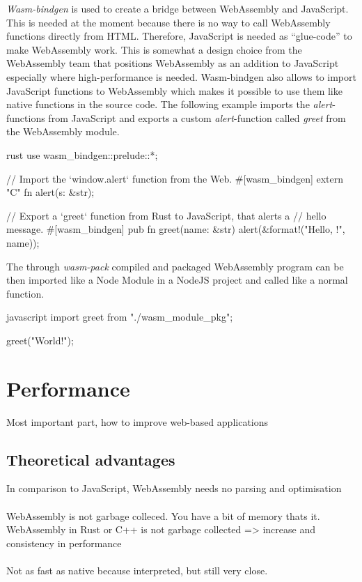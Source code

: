 \textit{Wasm-bindgen} is used to create a bridge between WebAssembly and JavaScript. This is needed at the moment because there is no way to call WebAssembly functions directly from HTML. Therefore, JavaScript is needed as ``glue-code'' to make WebAssembly work. This is somewhat a design choice from the WebAssembly team that positions WebAssembly as an addition to JavaScript especially where high-performance is needed. Wasm-bindgen also allows to import JavaScript functions to WebAssembly which makes it possible to use them like native functions in the source code. The following example imports the \textit{alert}-functions from JavaScript and exports a custom \textit{alert}-function called \textit{greet} from the WebAssembly module.
\begin{listing}
\begin{code}[]{rust}
use wasm_bindgen::prelude::*;

// Import the `window.alert` function from the Web.
#[wasm_bindgen]
extern "C" {
    fn alert(s: &str);
}

// Export a `greet` function from Rust to JavaScript, that alerts a
// hello message.
#[wasm_bindgen]
pub fn greet(name: &str) {
    alert(&format!("Hello, {}!", name));
}  
\end{code}
\caption{Rust source-code for WebAssembly \cite{rust:wasmbindgen}}
\label{lst:rust-wasm-bindgen}
\end{listing}
The through \textit{wasm-pack} compiled and packaged WebAssembly program can be then imported like a Node Module in a NodeJS project and called like a normal function.
\begin{listing}
\begin{code}[]{javascript}
import { greet } from "./wasm_module_pkg";

greet("World!");
\end{code}
\caption{Calling the WebAssembly module through JavaScript \cite{rust:wasmbindgen}}
\label{lst:js-wasm-bindgen}
\end{listing}

\newpage

\label{sec:performance}
\section{Performance}
Most important part, how to improve web-based applications
\subsection{Theoretical advantages}
In comparison to JavaScript, WebAssembly needs no parsing and optimisation 
\\\\
WebAssembly is not garbage colleced. You have a bit of memory thats it.
WebAssembly in Rust or C++ is not garbage collected => increase and consistency in performance
\\\\
Not as fast as native because interpreted, but still very close.
\\\\


